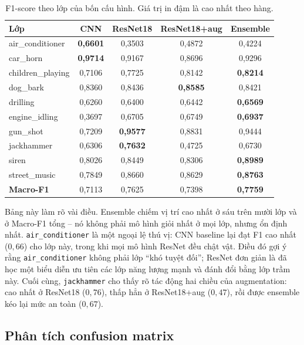 \begin{table}[H]
\centering
\caption{F1-score theo lớp của bốn cấu hình. Giá trị in đậm là cao nhất theo hàng.}
\label{tab:perclass}
\small
\begin{tabular}{lcccc}
\toprule
\textbf{Lớp} & \textbf{CNN} & \textbf{ResNet18} & \textbf{ResNet18+aug} & \textbf{Ensemble}\\
\midrule
air\_conditioner  & \textbf{0{,}6601} & 0{,}3503 & 0{,}4872 & 0{,}4224\\
car\_horn         & \textbf{0{,}9714} & 0{,}9167 & 0{,}8696 & 0{,}9296\\
children\_playing & 0{,}7106 & 0{,}7725 & 0{,}8142 & \textbf{0{,}8214}\\
dog\_bark         & 0{,}8360 & 0{,}8436 & \textbf{0{,}8585} & 0{,}8421\\
drilling          & 0{,}6260 & 0{,}6400 & 0{,}6442 & \textbf{0{,}6569}\\
engine\_idling    & 0{,}3697 & 0{,}6705 & 0{,}6749 & \textbf{0{,}6937}\\
gun\_shot         & 0{,}7209 & \textbf{0{,}9577} & 0{,}8831 & 0{,}9444\\
jackhammer        & 0{,}6306 & \textbf{0{,}7632} & 0{,}4725 & 0{,}6730\\
siren             & 0{,}8026 & 0{,}8449 & 0{,}8306 & \textbf{0{,}8989}\\
street\_music     & 0{,}7849 & 0{,}8660 & 0{,}8629 & \textbf{0{,}8763}\\
\midrule
\textbf{Macro-F1} & 0{,}7113 & 0{,}7625 & 0{,}7398 & \textbf{0{,}7759}\\
\bottomrule
\end{tabular}
\end{table}

Bảng này làm rõ vài điều. Ensemble chiếm vị trí cao nhất ở sáu trên mười lớp và
ở Macro-F1 tổng -- nó không phải mô hình giỏi nhất ở mọi lớp, nhưng ổn định nhất.
\texttt{air\_conditioner} là một ngoại lệ thú vị: CNN baseline lại đạt F1 cao
nhất ($0{,}66$) cho lớp này, trong khi mọi mô hình ResNet đều chật vật. Điều đó
gợi ý rằng \texttt{air\_conditioner} không phải lớp ``khó tuyệt đối''; ResNet
đơn giản là đã học một biểu diễn ưu tiên các lớp năng lượng mạnh và đánh đổi bằng
lớp trầm này. Cuối cùng, \texttt{jackhammer} cho thấy rõ tác động hai chiều của
augmentation: cao nhất ở ResNet18 ($0{,}76$), thấp hẳn ở ResNet18+aug ($0{,}47$),
rồi được ensemble kéo lại mức an toàn ($0{,}67$).

\subsection{Phân tích confusion matrix}

